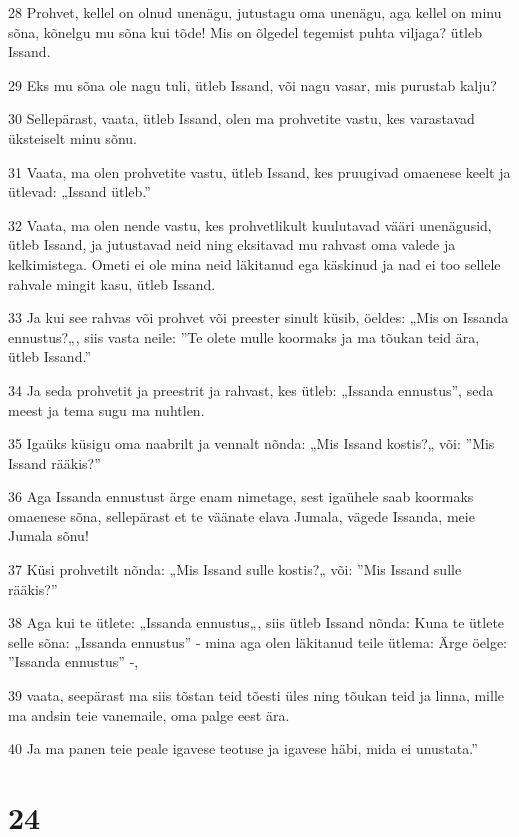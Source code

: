 \par 28 Prohvet, kellel on olnud unenägu, jutustagu oma unenägu, aga kellel on minu sõna, kõnelgu mu sõna kui tõde! Mis on õlgedel tegemist puhta viljaga? ütleb Issand.
\par 29 Eks mu sõna ole nagu tuli, ütleb Issand, või nagu vasar, mis purustab kalju?
\par 30 Sellepärast, vaata, ütleb Issand, olen ma prohvetite vastu, kes varastavad üksteiselt minu sõnu.
\par 31 Vaata, ma olen prohvetite vastu, ütleb Issand, kes pruugivad omaenese keelt ja ütlevad: „Issand ütleb.”
\par 32 Vaata, ma olen nende vastu, kes prohvetlikult kuulutavad vääri unenägusid, ütleb Issand, ja jutustavad neid ning eksitavad mu rahvast oma valede ja kelkimistega. Ometi ei ole mina neid läkitanud ega käskinud ja nad ei too sellele rahvale mingit kasu, ütleb Issand.
\par 33 Ja kui see rahvas või prohvet või preester sinult küsib, öeldes: „Mis on Issanda ennustus?„, siis vasta neile: ”Te olete mulle koormaks ja ma tõukan teid ära, ütleb Issand.”
\par 34 Ja seda prohvetit ja preestrit ja rahvast, kes ütleb: „Issanda ennustus”, seda meest ja tema sugu ma nuhtlen.
\par 35 Igaüks küsigu oma naabrilt ja vennalt nõnda: „Mis Issand kostis?„ või: ”Mis Issand rääkis?”
\par 36 Aga Issanda ennustust ärge enam nimetage, sest igaühele saab koormaks omaenese sõna, sellepärast et te väänate elava Jumala, vägede Issanda, meie Jumala sõnu!
\par 37 Küsi prohvetilt nõnda: „Mis Issand sulle kostis?„ või: ”Mis Issand sulle rääkis?”
\par 38 Aga kui te ütlete: „Issanda ennustus„, siis ütleb Issand nõnda: Kuna te ütlete selle sõna: „Issanda ennustus” - mina aga olen läkitanud teile ütlema: Ärge öelge: ”Issanda ennustus” -,
\par 39 vaata, seepärast ma siis tõstan teid tõesti üles ning tõukan teid ja linna, mille ma andsin teie vanemaile, oma palge eest ära.
\par 40 Ja ma panen teie peale igavese teotuse ja igavese häbi, mida ei unustata.”

\chapter{24}

